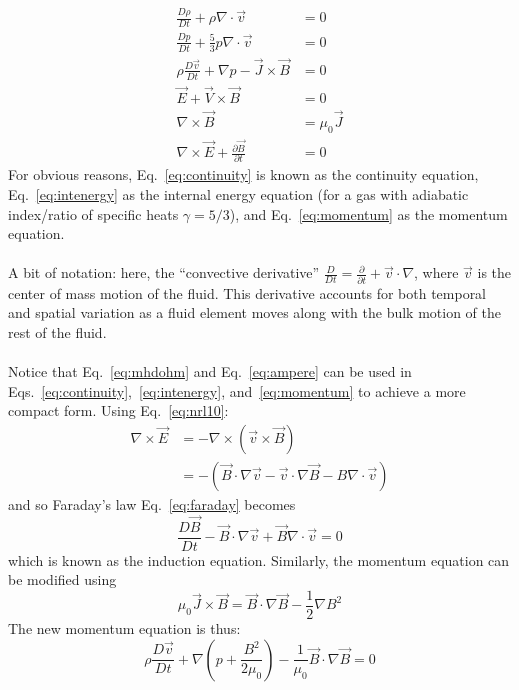 \begin{align}
  \frac{D\rho}{Dt}+\rho\nabla\cdot\vec v&=0\label{eq:continuity}\\
  \frac{Dp}{Dt}+\frac53p\nabla\cdot\vec v&=0\label{eq:intenergy}\\
  \rho\frac{D\vec v}{Dt}+\nabla p-\vec J\times\vec B&=0\label{eq:momentum}\\
  \vec E+\vec V\times\vec B&=0\label{eq:mhdohm}\\
  \nabla\times\vec B&=\mu_0\vec J\label{eq:ampere}\\
  \nabla\times\vec E+\frac{\partial\vec B}{\partial t}&=0\label{eq:faraday}
\end{align}
For obvious reasons, Eq.~\ref{eq:continuity} is known as the continuity equation, Eq.~\ref{eq:intenergy} as the internal energy equation (for a gas with adiabatic index/ratio of specific heats $\gamma=5/3$), and Eq.~\ref{eq:momentum} as the momentum equation.\\
\\
A bit of notation: here, the ``convective derivative'' $\frac{D}{Dt}=\frac{\partial}{\partial t}+\vec v\cdot\nabla$, where $\vec v$ is the center of mass motion of the fluid. This derivative accounts for both temporal and spatial variation as a fluid element moves along with the bulk motion of the rest of the fluid.\\
\\
Notice that Eq.~\ref{eq:mhdohm} and Eq.~\ref{eq:ampere} can be used in Eqs.~\ref{eq:continuity},~\ref{eq:intenergy}, and~\ref{eq:momentum} to achieve a more compact form. Using Eq.~\ref{eq:nrl10}:
\begin{align*}
  \nabla\times\vec E&=-\nabla\times(\vec v\times\vec B)\\
  &=-(\vec B\cdot\nabla\vec v-\vec v\cdot\nabla\vec B-B\nabla\cdot\vec v)
\end{align*}
and so Faraday's law Eq.~\ref{eq:faraday} becomes
\begin{equation}
  \frac{D\vec B}{Dt}-\vec B\cdot\nabla\vec v+\vec B\nabla\cdot\vec v=0\label{eq:faraday2}
\end{equation}
which is known as the induction equation. Similarly, the momentum equation can be modified using
\begin{equation}
  \mu_0\vec J\times\vec B=\vec B\cdot\nabla\vec B-\frac12\nabla B^2
\end{equation}
The new momentum equation is thus:
\begin{equation}
  \rho\frac{D\vec v}{Dt}+\nabla\left(p+\frac{B^2}{2\mu_0}\right)-\frac1{\mu_0}\vec B\cdot\nabla\vec B=0
\end{equation}
